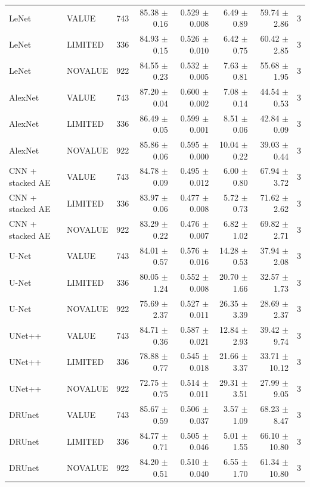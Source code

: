 \begin{table}[t]
\begin{tabular}{llrrrrrr}
LeNet & VALUE & 743 & 85.38 $\pm$ 0.16 & 0.529 $\pm$ 0.008 & 6.49 $\pm$ 0.89 & 59.74 $\pm$ 2.86 & 3 \\
LeNet & LIMITED & 336 & 84.93 $\pm$ 0.15 & 0.526 $\pm$ 0.010 & 6.42 $\pm$ 0.75 & 60.42 $\pm$ 2.85 & 3 \\
LeNet & NOVALUE & 922 & 84.55 $\pm$ 0.23 & 0.532 $\pm$ 0.005 & 7.63 $\pm$ 0.81 & 55.68 $\pm$ 1.95 & 3 \\
AlexNet & VALUE & 743 & 87.20 $\pm$ 0.04 & 0.600 $\pm$ 0.002 & 7.08 $\pm$ 0.14 & 44.54 $\pm$ 0.53 & 3 \\
AlexNet & LIMITED & 336 & 86.49 $\pm$ 0.05 & 0.599 $\pm$ 0.001 & 8.51 $\pm$ 0.06 & 42.84 $\pm$ 0.09 & 3 \\
AlexNet & NOVALUE & 922 & 85.86 $\pm$ 0.06 & 0.595 $\pm$ 0.000 & 10.04 $\pm$ 0.22 & 39.03 $\pm$ 0.44 & 3 \\
CNN + stacked AE & VALUE & 743 & 84.78 $\pm$ 0.09 & 0.495 $\pm$ 0.012 & 6.00 $\pm$ 0.80 & 67.94 $\pm$ 3.72 & 3 \\
CNN + stacked AE & LIMITED & 336 & 83.97 $\pm$ 0.06 & 0.477 $\pm$ 0.008 & 5.72 $\pm$ 0.73 & 71.62 $\pm$ 2.62 & 3 \\
CNN + stacked AE & NOVALUE & 922 & 83.29 $\pm$ 0.22 & 0.476 $\pm$ 0.007 & 6.82 $\pm$ 1.02 & 69.82 $\pm$ 2.71 & 3 \\
U-Net & VALUE & 743 & 84.01 $\pm$ 0.57 & 0.576 $\pm$ 0.016 & 14.28 $\pm$ 0.53 & 37.94 $\pm$ 2.08 & 3 \\
U-Net & LIMITED & 336 & 80.05 $\pm$ 1.24 & 0.552 $\pm$ 0.008 & 20.70 $\pm$ 1.66 & 32.57 $\pm$ 1.73 & 3 \\
U-Net & NOVALUE & 922 & 75.69 $\pm$ 2.37 & 0.527 $\pm$ 0.011 & 26.35 $\pm$ 3.39 & 28.69 $\pm$ 2.37 & 3 \\
UNet++ & VALUE & 743 & 84.71 $\pm$ 0.36 & 0.587 $\pm$ 0.021 & 12.84 $\pm$ 2.93 & 39.42 $\pm$ 9.74 & 3 \\
UNet++ & LIMITED & 336 & 78.88 $\pm$ 0.77 & 0.545 $\pm$ 0.018 & 21.66 $\pm$ 3.37 & 33.71 $\pm$ 10.12 & 3 \\
UNet++ & NOVALUE & 922 & 72.75 $\pm$ 0.75 & 0.514 $\pm$ 0.011 & 29.31 $\pm$ 3.51 & 27.99 $\pm$ 9.05 & 3 \\
DRUnet & VALUE & 743 & 85.67 $\pm$ 0.59 & 0.506 $\pm$ 0.037 & 3.57 $\pm$ 1.09 & 68.23 $\pm$ 8.47 & 3 \\
DRUnet & LIMITED & 336 & 84.77 $\pm$ 0.71 & 0.505 $\pm$ 0.046 & 5.01 $\pm$ 1.55 & 66.10 $\pm$ 10.80 & 3 \\
DRUnet & NOVALUE & 922 & 84.20 $\pm$ 0.51 & 0.510 $\pm$ 0.040 & 6.55 $\pm$ 1.70 & 61.34 $\pm$ 10.80 & 3 \\

\end{tabular}
\end{table}
